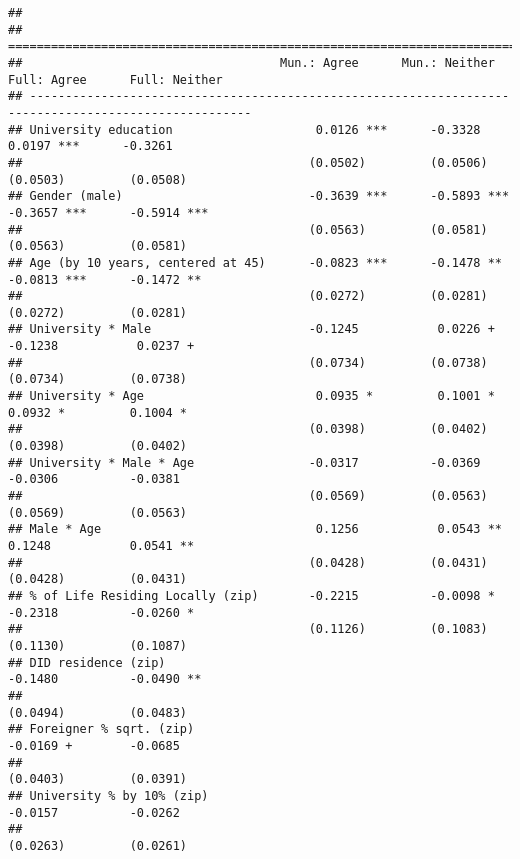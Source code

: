 \documentclass[
]{article}
\begin{document}
\begin{verbatim}
## 
## =====================================================================================================
##                                    Mun.: Agree      Mun.: Neither    Full: Agree      Full: Neither  
## -----------------------------------------------------------------------------------------------------
## University education                    0.0126 ***      -0.3328           0.0197 ***      -0.3261    
##                                        (0.0502)         (0.0506)         (0.0503)         (0.0508)   
## Gender (male)                          -0.3639 ***      -0.5893 ***      -0.3657 ***      -0.5914 ***
##                                        (0.0563)         (0.0581)         (0.0563)         (0.0581)   
## Age (by 10 years, centered at 45)      -0.0823 ***      -0.1478 **       -0.0813 ***      -0.1472 ** 
##                                        (0.0272)         (0.0281)         (0.0272)         (0.0281)   
## University * Male                      -0.1245           0.0226 +        -0.1238           0.0237 +  
##                                        (0.0734)         (0.0738)         (0.0734)         (0.0738)   
## University * Age                        0.0935 *         0.1001 *         0.0932 *         0.1004 *  
##                                        (0.0398)         (0.0402)         (0.0398)         (0.0402)   
## University * Male * Age                -0.0317          -0.0369          -0.0306          -0.0381    
##                                        (0.0569)         (0.0563)         (0.0569)         (0.0563)   
## Male * Age                              0.1256           0.0543 **        0.1248           0.0541 ** 
##                                        (0.0428)         (0.0431)         (0.0428)         (0.0431)   
## % of Life Residing Locally (zip)       -0.2215          -0.0098 *        -0.2318          -0.0260 *  
##                                        (0.1126)         (0.1083)         (0.1130)         (0.1087)   
## DID residence (zip)                                                      -0.1480          -0.0490 ** 
##                                                                          (0.0494)         (0.0483)   
## Foreigner % sqrt. (zip)                                                  -0.0169 +        -0.0685    
##                                                                          (0.0403)         (0.0391)   
## University % by 10% (zip)                                                -0.0157          -0.0262    
##                                                                          (0.0263)         (0.0261)   

\end{verbatim}
\end{document}
